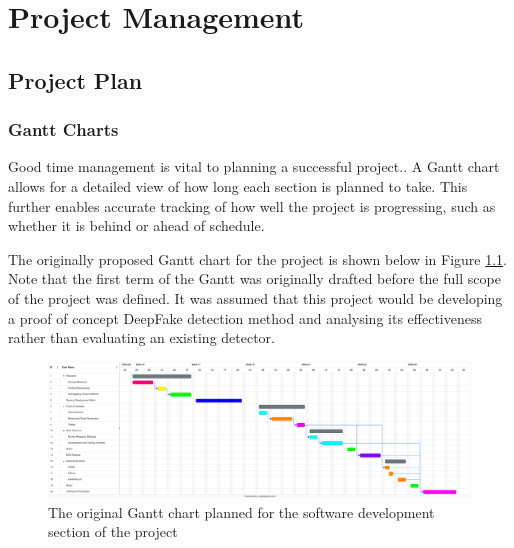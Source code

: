 \chapter{Project Management}
\label{ch:projman}

\section{Project Plan}


\subsection{Gantt Charts}

Good time management is vital to planning a successful project.. A Gantt chart allows for a detailed view of how long each section is planned to take. This further enables accurate tracking of how well the project is progressing, such as whether it is behind or ahead of schedule.

The originally proposed Gantt chart for the project is shown below in Figure \ref{fig:original-gantt}. Note that the first term of the Gantt was originally drafted before the full scope of the project was defined. It was assumed that this project would be developing a proof of concept DeepFake detection method and analysing its effectiveness rather than evaluating an existing detector.

\begin{figure}[H]
    \centering
    \includegraphics[width=1\linewidth]{dissertation/figures/original-gantt.png}
    \caption{The original Gantt chart planned for the software development section of the project}
    \label{fig:original-gantt}
\end{figure}

